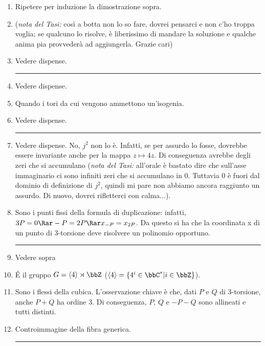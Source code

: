 \begin{enumerate}
\item Ripetere per induzione la dimostrazione sopra.
\item ({\it nota del Tasi:} così a botta non lo so fare, dovrei pensarci e non c'ho troppa voglia; se qualcuno lo risolve, è liberissimo di mandare la soluzione e qualche anima pia provvederà ad aggiungerla. Grazie cari)
\item Vedere dispense.
\bigskip
\hrule
\bigskip

\item Vedere dispense.
\item Quando i tori da cui vengono ammettono un'isogenia.
\item Vedere dispense.
\bigskip
\hrule
\bigskip

\item Vedere dispense. No, $j^2$ non lo è. Infatti, se per assurdo lo fosse, dovrebbe essere invariante anche per la mappa $z\mapsto 4z$. Di conseguenza avrebbe degli zeri che si accumulano ({\it nota del Tasi:} all'orale è bastato dire che sull'asse immaginario ci sono infiniti zeri che si accumulano in 0. Tuttavia 0 è fuori dal dominio di definizione di $j^2$, quindi mi pare non abbiamo ancora raggiunto un assurdo. Di nuovo, dovrei rifletterci con calma...).
\item Sono i punti fissi della formula di duplicazione: infatti, $3P=0 \Rar -P=2P \Rar x_{-P}=x_{2P}$. Da questo si ha che la coordinata x di un punto di 3-torsione deve risolvere un polinomio opportuno. 
\bigskip
\hrule
\bigskip

\item Vedere sopra
\item \'E il gruppo $G=\langle 4\rangle \rtimes \bbZ$ ($\langle 4 \rangle = \{ 4^i \in \bbC^* | i \in \bbZ\}$).
\item Sono i flessi della cubica. L'osservazione chiave è che, dati $P$ e $Q$ di 3-torsione, anche $P+Q$ ha ordine 3. Di conseguenza, $P$, $Q$ e $-P-Q$ sono allineati e tutti distinti.
\item Controimmagine della fibra generica.
\bigskip
\hrule
\bigskip


\end{enumerate}
